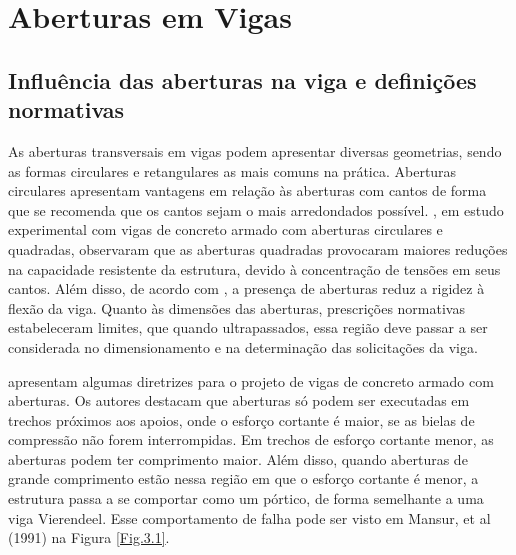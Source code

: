 %
%
%
%
\chapter{Aberturas em Vigas}

\section{Influência das aberturas na viga e definições normativas}

As aberturas transversais em vigas podem apresentar diversas geometrias, sendo as formas circulares e retangulares as mais comuns na prática. Aberturas circulares apresentam vantagens em relação às aberturas com cantos de forma que se recomenda que os cantos sejam o mais arredondados possível. , em estudo experimental com vigas de concreto armado com aberturas circulares e quadradas, observaram que as aberturas quadradas provocaram maiores reduções na capacidade resistente da estrutura, devido à concentração de tensões em seus cantos. Além disso, de acordo com , a presença de aberturas reduz a rigidez à flexão da viga.
Quanto às dimensões das aberturas, prescrições normativas estabeleceram limites, que quando ultrapassados, essa região deve passar a ser considerada no dimensionamento e na determinação das solicitações da viga. 

 apresentam algumas diretrizes para o projeto de vigas de concreto armado com aberturas. Os autores destacam que aberturas só podem ser executadas em trechos próximos aos apoios, onde o esforço cortante é maior, se as bielas de compressão não forem interrompidas. Em trechos de esforço cortante menor, as aberturas podem ter comprimento maior. Além disso, quando aberturas de grande comprimento estão nessa região em que o esforço cortante é menor, a estrutura passa a se comportar como um pórtico, de forma semelhante a uma viga Vierendeel. Esse comportamento de falha pode ser visto em Mansur, et al (1991) na Figura \ref{Fig.3.1}.

